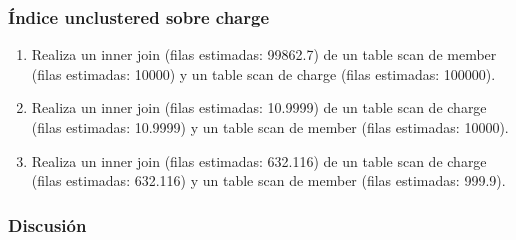 \subsubsection{Índice unclustered sobre charge}
\begin{enumerate}[label=(\alph*)]
  \item Realiza un inner join (filas estimadas: 99862.7) de un table scan de member (filas estimadas: 10000) y un table scan de charge (filas estimadas: 100000).
  \item Realiza un inner join (filas estimadas: 10.9999) de un table scan de charge (filas estimadas: 10.9999) y un table scan de member (filas estimadas: 10000).
  \item Realiza un inner join (filas estimadas: 632.116) de un table scan de charge (filas estimadas: 632.116) y un table scan de member (filas estimadas: 999.9).
\end{enumerate}

\subsubsection{Discusión}
